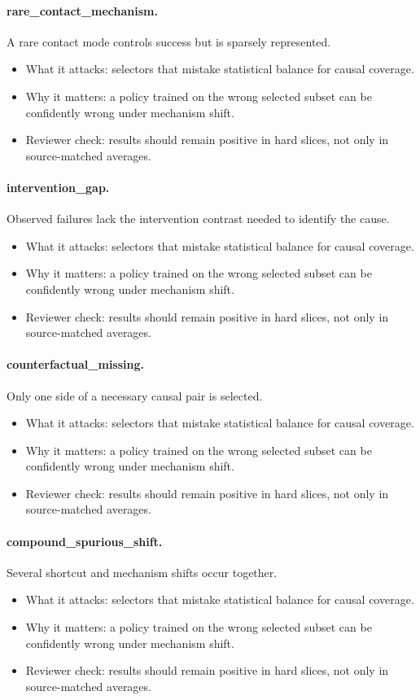 \documentclass{article}
\begin{document}
\paragraph{rare\_contact\_mechanism.} A rare contact mode controls success but is sparsely represented.
\begin{itemize}
\item What it attacks: selectors that mistake statistical balance for causal coverage.
\item Why it matters: a policy trained on the wrong selected subset can be confidently wrong under mechanism shift.
\item Reviewer check: results should remain positive in hard slices, not only in source-matched averages.
\end{itemize}
\paragraph{intervention\_gap.} Observed failures lack the intervention contrast needed to identify the cause.
\begin{itemize}
\item What it attacks: selectors that mistake statistical balance for causal coverage.
\item Why it matters: a policy trained on the wrong selected subset can be confidently wrong under mechanism shift.
\item Reviewer check: results should remain positive in hard slices, not only in source-matched averages.
\end{itemize}
\paragraph{counterfactual\_missing.} Only one side of a necessary causal pair is selected.
\begin{itemize}
\item What it attacks: selectors that mistake statistical balance for causal coverage.
\item Why it matters: a policy trained on the wrong selected subset can be confidently wrong under mechanism shift.
\item Reviewer check: results should remain positive in hard slices, not only in source-matched averages.
\end{itemize}
\paragraph{compound\_spurious\_shift.} Several shortcut and mechanism shifts occur together.
\begin{itemize}
\item What it attacks: selectors that mistake statistical balance for causal coverage.
\item Why it matters: a policy trained on the wrong selected subset can be confidently wrong under mechanism shift.
\item Reviewer check: results should remain positive in hard slices, not only in source-matched averages.
\end{itemize}
\clearpage
\end{document}
